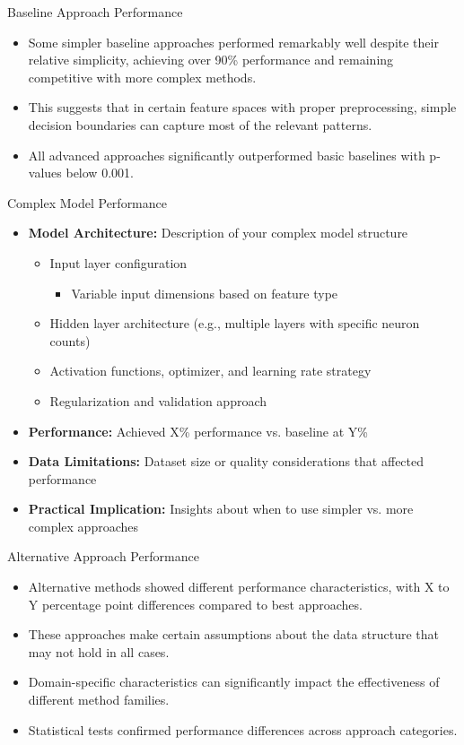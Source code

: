 \documentclass[
    10pt,
    aspectratio=169,
]{beamer}
\begin{document}
\begin{frame}{Baseline Approach Performance}
\begin{itemize}
    \item Some simpler baseline approaches performed remarkably well despite their relative simplicity, achieving over 90\% performance and remaining competitive with more complex methods.
    \item This suggests that in certain feature spaces with proper preprocessing, simple decision boundaries can capture most of the relevant patterns.
    \item All advanced approaches significantly outperformed basic baselines with p-values below 0.001.
\end{itemize}
\end{frame}

\begin{frame}{Complex Model Performance}
\begin{itemize}
    \item \textbf{Model Architecture:} Description of your complex model structure
    \begin{itemize}
        \item Input layer configuration
        \begin{itemize}
            \scriptsize
            \item Variable input dimensions based on feature type
        \end{itemize}
        \item Hidden layer architecture (e.g., multiple layers with specific neuron counts)
        \item Activation functions, optimizer, and learning rate strategy
        \item Regularization and validation approach
    \end{itemize}
    \item \textbf{Performance:} Achieved X\% performance vs. baseline at Y\%
    \item \textbf{Data Limitations:} Dataset size or quality considerations that affected performance
    \item \textbf{Practical Implication:} Insights about when to use simpler vs. more complex approaches
\end{itemize}
\end{frame}

\begin{frame}{Alternative Approach Performance}
\begin{itemize}
    \item Alternative methods showed different performance characteristics, with X to Y percentage point differences compared to best approaches.
    \item These approaches make certain assumptions about the data structure that may not hold in all cases.
    \item Domain-specific characteristics can significantly impact the effectiveness of different method families.
    \item Statistical tests confirmed performance differences across approach categories.
\end{itemize}
\end{frame}
\end{document}
